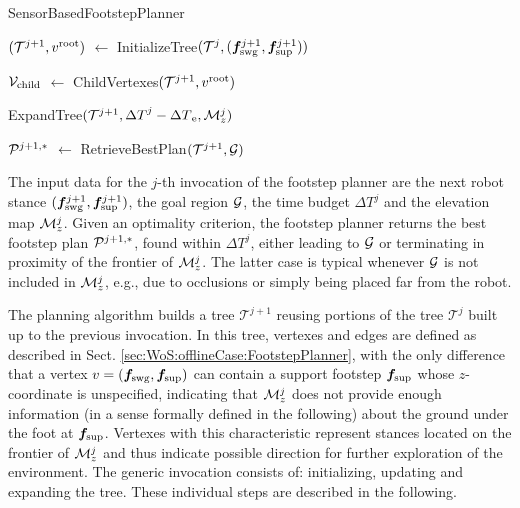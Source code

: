 \begin{algorithm}%
	\small
	\removelatexerror
	
	\caption{SensorBasedFootstepPlanner}
	\label{alg:AnytimeFootstepPlanner}

	\vspace{2pt}
    \BlankLine

    $({\cal T}^{j+1}, v^{\rm root})$ $\leftarrow$ InitializeTree$({\cal T}^j, ({{\bm{f}}}_{\rm swg}^{j+1}, {{\bm{f}}}_{\rm sup}^{j+1}))$\; 
	
    ${\cal V}_{\rm child}$ $\leftarrow$ ChildVertexes$({\cal T}^{j+1}, v^{\rm root})$\;

	ExpandTree$({\cal T}^{j+1}, {\Delta T}^j - {\Delta T}_{\rm e}, {\cal M}_z^j)$\;

	${\cal P}^{j+1,*}$ $\leftarrow$ RetrieveBestPlan$({\cal T}^{j+1}, {\cal G})$\;
    \;
\end{algorithm}

The input data for the $j$-th invocation of the footstep planner are the next robot stance $({\bm{f}}_{\rm swg}^{j+1}, {\bm{f}}_{\rm sup}^{j+1})$, the goal region $\cal G$, the time budget ${\Delta T}^j$ and the elevation map ${\cal M}_z^j$. 
Given an optimality criterion, the footstep planner returns the best footstep plan ${\cal P}^{j+1,*}$, found within ${\Delta T}^j$, either leading to $\cal G$ or terminating in proximity of the frontier of ${\cal M}_z^j$.
The latter case is typical whenever $\cal G$ is not included in ${\cal M}_z^j$, e.g., due to occlusions or simply being placed far from the robot.

The planning algorithm builds a tree $\mathcal{T}^{j+1}$ reusing portions of the tree $\mathcal{T}^{j}$ built up to the previous invocation. 
In this tree, vertexes and edges are defined as described in Sect. \ref{sec:WoS:offlineCase:FootstepPlanner}, with the only difference that a vertex $v = ({\bm{f}}_{\rm swg}, {\bm{f}}_{\rm sup})$ can contain a support footstep ${\bm{f}}_{\rm sup}$ whose $z$-coordinate is unspecified, indicating that ${\cal M}_z^j$ does not provide enough information (in a sense formally defined in the following) about the ground under the foot at ${\bm{f}}_{\rm sup}$. 
Vertexes with this characteristic represent stances located on the frontier of ${\cal M}_z^j$ and thus indicate possible direction for further exploration of the environment. 
%
The generic invocation consists of: initializing, updating and expanding the tree. These individual steps are described in the following.

